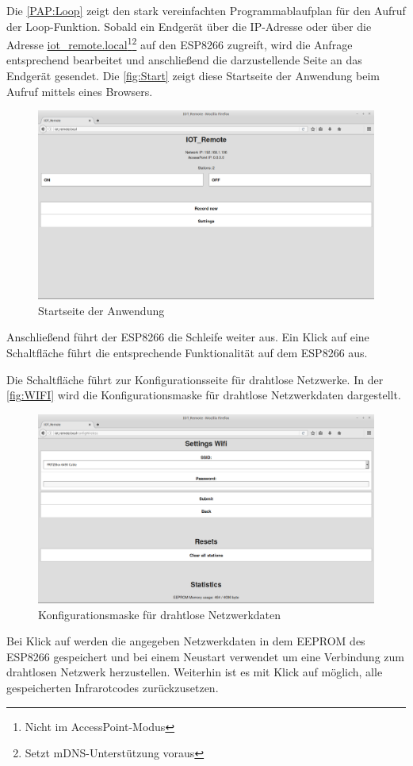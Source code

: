 Die \autoref{PAP:Loop} zeigt den stark vereinfachten Programmablaufplan für den Aufruf der Loop-Funktion.
Sobald ein Endgerät über die IP-Adresse oder über die Adresse \url{iot_remote.local}\footnote{Nicht im AccessPoint-Modus}\footnote{Setzt \acs{mDNS}-Unterstützung voraus} auf den ESP8266 zugreift, wird die Anfrage entsprechend bearbeitet und anschließend die darzustellende Seite an das Endgerät gesendet.
Die \autoref{fig:Start} zeigt diese Startseite der Anwendung beim Aufruf mittels eines Browsers.
\begin{figure}[!ht]
	\centering
	\includegraphics[scale=0.3]{Abbildungen/Start}
	\caption{Startseite der Anwendung}
	\label{fig:Start}
\end{figure}
Anschließend führt der ESP8266 die Schleife weiter aus.
Ein Klick auf eine Schaltfläche führt die entsprechende Funktionalität auf dem ESP8266 aus.

Die Schaltfläche  führt zur Konfigurationsseite für drahtlose Netzwerke.
In der \autoref{fig:WIFI} wird die Konfigurationsmaske für drahtlose Netzwerkdaten dargestellt.
\begin{figure}[!ht]
	\centering
	\includegraphics[scale=0.3]{Abbildungen/WIFI}
	\caption{Konfigurationsmaske für drahtlose Netzwerkdaten}
	\label{fig:WIFI}
\end{figure}
Bei Klick auf  werden die angegeben Netzwerkdaten in dem \acs{EEPROM} des ESP8266 gespeichert und bei einem Neustart verwendet um eine Verbindung zum drahtlosen Netzwerk herzustellen.
Weiterhin ist es mit Klick auf  möglich, alle gespeicherten Infrarotcodes zurückzusetzen.

